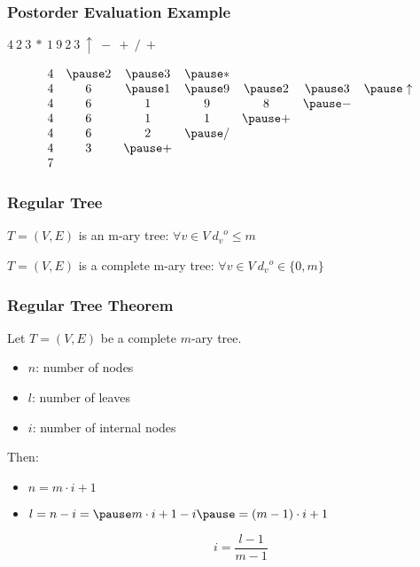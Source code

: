\documentclass[dvipsnames]{beamer}
\begin{document}
\begin{frame}
  \frametitle{Postorder Evaluation Example}

  \begin{example}[$t ~ u ~ v ~ * ~ w ~ x ~ y ~ z ~ \uparrow ~ - ~ + ~ / ~ +$]
    $4 ~ 2 ~ 3 ~ * ~ 1 ~ 9 ~ 2 ~ 3 ~ \uparrow ~ - ~ + ~ / ~ +$

    \pause
    \medskip
    \[
      \begin{array}{ccccccc}
  4 & \pause 2 & \pause 3 & \pause * &          &          &                \\
  4 &        6 & \pause 1 & \pause 9 & \pause 2 & \pause 3 & \pause \uparrow\\
  4 &        6 &        1 &        9 &        8 & \pause - &                \\
  4 &        6 &        1 &        1 & \pause + &          &                \\
  4 &        6 &        2 & \pause / &          &          &                \\
  4 &        3 & \pause + &          &          &          &                \\
  7 &          &          &          &          &          &                \\
      \end{array}
    \]
  \end{example}
\end{frame}

\begin{frame}
  \frametitle{Regular Tree}

  \begin{definition}
    $T=(V,E)$ is an \alert{m-ary tree}: $\forall v \in V~{d_v}^o \leq m$

    \bigskip
    $T=(V,E)$ is a complete m-ary tree:
      $\forall v \in V~{d_v}^o \in \{0,m\}$
  \end{definition}
\end{frame}

\begin{frame}
  \frametitle{Regular Tree Theorem}

  \begin{theorem}
    Let $T=(V,E)$ be a complete $m$-ary tree.

    \begin{itemize}
      \item $n$: number of nodes
      \item $l$: number of leaves
      \item $i$: number of internal nodes
    \end{itemize}

    Then:
    \pause
    \begin{itemize}
      \item $n = m \cdot i + 1$

      \pause
      \item  $l = n - i = \pause m \cdot i + 1 - i
        \pause = (m - 1) \cdot i + 1$

      \pause
      \[
        i = \frac{l - 1}{m - 1}
      \]
    \end{itemize}
  \end{theorem}
\end{frame}
\end{document}
